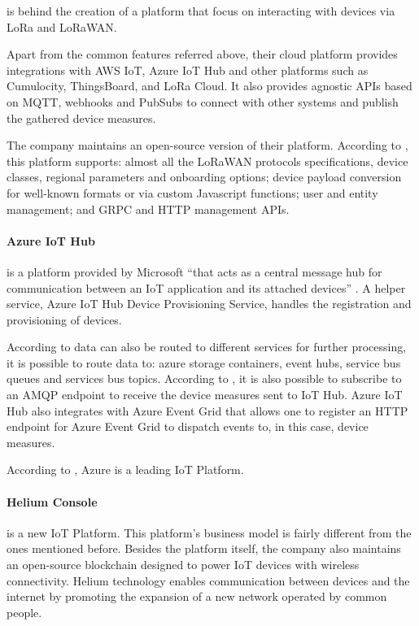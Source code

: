  is behind the creation of a platform that focus on interacting with devices via LoRa and LoRaWAN.

Apart from the common features referred above, their cloud platform provides integrations with AWS IoT, Azure IoT Hub and other platforms such as Cumulocity, ThingsBoard, and LoRa Cloud. It also provides agnostic \gls{API}s based on \gls{MQTT}, webhooks and PubSubs to connect with other systems and publish the gathered device measures.

The company maintains an open-source version of their platform. According to , this platform supports: almost all the LoRaWAN protocols specifications, device classes, regional parameters and onboarding options; device payload conversion for well-known formats or via custom Javascript functions; user and entity management; and GRPC and HTTP management \gls{API}s. 

\paragraph{Azure IoT Hub}
\label{par:stateofart:arch:infra:middleware:azure}

 is a platform provided by Microsoft ``that acts as a central message hub for communication between an IoT application and its attached devices'' \parencite{azure-hub}. A helper service, Azure IoT Hub Device Provisioning Service, handles the registration and provisioning of devices.

According to \cite{azure-hub} data can also be routed to different services for further processing, it is possible to route data to: azure storage containers, event hubs, service bus queues and services bus topics. According to \cite{azure-hub-amqp}, it is also possible to subscribe to an \gls{AMQP} endpoint to receive the device measures sent to \gls{IoT} Hub. Azure IoT Hub also integrates with Azure Event Grid that allows one to register an HTTP endpoint for Azure Event Grid to dispatch events to, in this case, device measures.

According to , Azure is a leading \gls{IoT} Platform.

\paragraph{Helium Console}
\label{par:stateofart:arch:infra:middleware:helium}

 is a new \gls{IoT} Platform. This platform's business model is fairly different from the ones mentioned before. Besides the platform itself, the company also maintains an open-source blockchain designed to power \gls{IoT} devices with wireless connectivity. Helium technology enables communication between devices and the internet by promoting the expansion of a new network operated by common people.

